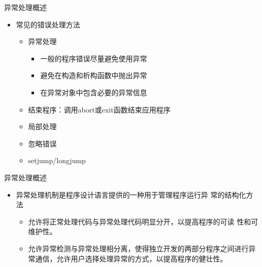 \begin{frame}[t, fragile]{异常处理概述}%
  \begin{itemize}
  \item 常见的错误处理方法
    \begin{itemize}
    \item 异常处理
      \begin{itemize}
      \item 一般的程序错误尽量避免使用异常
      \item 避免在构造和析构函数中抛出异常
      \item 在异常对象中包含必要的异常信息
      \end{itemize}
    \item 结束程序：调用abort或exit函数结束应用程序
    \item 局部处理
    \item 忽略错误
    \item setjump/longjump
    \end{itemize}
  \end{itemize}
\end{frame}

\begin{frame}[t, fragile]{异常处理概述}%
  \begin{itemize}
  \item \alert{异常处理机制}是程序设计语言提供的一种用于管理程序运行异
    常的结构化方法
    \begin{itemize}
      \item 允许将正常处理代码与异常处理代码明显分开，以提高程序的可读
        性和可维护性。
      \item 允许异常检测与异常处理相分离，使得独立开发的两部分程序之间进行异常通信，允许用户选择处理异常的方式，以提高程序的健壮性。
    \end{itemize}    
  \end{itemize}
\end{frame}


